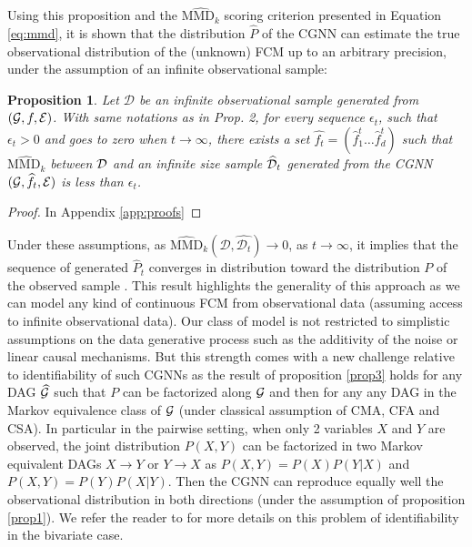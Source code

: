 \documentclass[a4paper, 11pt]{article}
\newtheorem{prop}{Proposition}
\begin{document}
Using this proposition and the $\widehat{\text{MMD}_k}$ scoring criterion presented in Equation \ref{eq:mmd}, it is shown that the distribution $\hat P$ of the CGNN can estimate the true observational distribution of the (unknown) FCM up to an arbitrary precision, under the assumption of an infinite observational sample:


 \begin{prop}{\label{prop3}}
Let  $\mathcal{D}$ be an infinite observational sample generated from $({\cal G}, f, {\cal E})$.
With same notations as in Prop. 2, for every  sequence $\epsilon_t$, such that $\epsilon_t>0$ and goes to zero when $t \rightarrow \infty$, there exists a set $\widehat{f_t} = (\hat f^{t}_1 \ldots \hat f^{t}_d)$ such that $\widehat{\text{MMD}_k}$ between $\cal D$ and an infinite size sample $\widehat{\cal D}_{t}$ generated from the CGNN $({\cal G},\widehat{f_{t}},\cal E)$ is less than $\epsilon_t$.
 \end{prop}
 
 
\begin{proof}
In Appendix \ref{app:proofs}
\end{proof}

Under these assumptions, as $\widehat{\text{MMD}}_k(\mathcal{D}, \hat{\mathcal{D}_{t}}) \rightarrow 0$, as $t \rightarrow \infty$, it implies that the sequence of generated $\hat{P}_t$ converges in distribution toward  the distribution $P$ of the observed sample \citep{gretton2007kernel}. This result highlights the generality of this approach as we can model any kind of continuous FCM from observational data (assuming access to infinite observational data). Our class of model is not restricted to  simplistic assumptions on the data generative process such as the additivity of the noise or linear causal mechanisms. But this strength comes with a new challenge relative to identifiability of such CGNNs as the result of proposition \ref{prop3} holds for any DAG  $\widehat{\cal G}$ such that $P$ can be factorized along $\cal G$ and then for any any DAG in the Markov equivalence class of ${\cal G}$ (under classical assumption of CMA, CFA and CSA).  In particular in the pairwise setting, when only 2 variables $X$ and $Y$ are observed, the joint distribution $P(X,Y)$ can be factorized in two Markov equivalent DAGs $X\rightarrow Y$ or $Y\rightarrow X$ as $P(X,Y) = P(X) P(Y|X)$ and $P(X,Y) = P(Y) P(X|Y)$. Then the CGNN can reproduce equally well the observational distribution in both directions (under the assumption of proposition \ref{prop1}).  We refer the reader to \cite{zhang2009identifiability} for more details on this problem of identifiability in the  bivariate case. 
\end{document}
